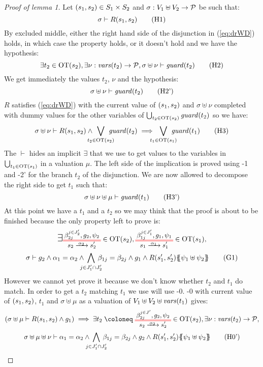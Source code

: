 \documentclass{article}
\begin{document}
\begin{proof}[Proof of lemma 1]
	Let \({\left(s_1, s_2\right)} \in S_1 \times S_2\) and \(\sigma: V_1 \uplus V_2 \to \mathcal{P}\) be such that:
	\[ \sigma \vdash R\mpar{s_1, s_2} \hyp{1} \]
	By excluded middle, either the right hand side of the disjunction in (\ref{eq:drWD}) holds, in which case the property holds, or it doesn't hold and we have the hypothesis:
	\[ \exists t_2 \in \fOT{s_2}, \exists \nu: \fvars{t_2} \to \values, \sigma \uplus \nu \vdash \fguard{t_2} \hyp{2} \]
	We get immediately the values \(t_2\), \(\nu\) and the hypothesis:
	\[ \sigma \uplus \nu \vdash \fguard{t_2} \hyp{2'} \]
	\(R\) satisfies (\ref{eq:drWD}) with the current value of \({\left(s_1, s_2\right)}\) and \(\sigma \uplus \nu\) completed with dummy values for the other variables of \(\bigcup_{t_2 \in \mathrm{OT}{\left(s_2\right)}} \mathit{guard}{\left(t_2\right)}\) so we have:
	\[ \sigma \uplus \nu \vdash R\mpar{s_1, s_2} \wedge \bigvee_\subbox{t_2 \in \fOT{s_2}} \fguard{t_2} \implies \bigvee_\subbox{t_1 \in \fOT{s_1}} \fguard{t_1} \hyp{3} \]
	The \(\vdash\) hides an implicit \(\exists\) that we use to get values to the variables in \(\bigcup_{t_1 \in \mathrm{OT}{\left(s_1\right)}}\) in a valuation \(\mu\).
	The left side of the implication is proved using \hyp{1} and \hyp{2'} for the branch \(t_2\) of the disjunction.
	We are now allowed to decompose the right side to get \(t_1\) such that:
	\[ \sigma \uplus \nu \uplus \mu \vdash \fguard{t_1} \hyp{3'} \]
	At this point we have a \(t_1\) and a \(t_2\) so we may think that the proof is about to be finished because the only property left to prove is:
	\begin{multline}
		\bigsymb{\exists} \OTx{2}{}{2}{2} \in \fOT{s_2}, \OTx{1}{}{1}{1} \in \fOT{s_1}, \\
		\sigma \vdash g_2 \wedge \alpha_1 = \alpha_2 \wedge \bigwedge_\subbox{j \in J'_1 \cap J'_2} \beta_{1j} = \beta_{2j} \wedge g_1 \wedge R\mpar{s'_1, s'_2}\psubst{\psi_1 \uplus \psi_2} \goal{1}
	\end{multline}
	However we cannot yet prove it because we don't know whether \(t_2\) and \(t_1\) do match.
	In order to get a \(t_2\) matching \(t_1\) we use will use \hyp{0}.
	\hyp{0} with current value of \({\left(s_1, s_2\right)}\), \(t_1\) and \(\sigma \uplus \mu\) as a valuation of \(V_1 \uplus V_2 \uplus \mathit{vars}{\left(t_1\right)}\) gives:
	\begin{multline}
		\mpar{\sigma \uplus \mu \vdash R\mpar{s_1, s_2} \wedge g_1} \implies \exists t_2 \defobject \OTx{2}{}{2}{} \in \fOT{s_2}, \exists \nu: \fvars{t_2} \to \values, \\
		\sigma \uplus \mu \uplus \nu \vdash \alpha_1 = \alpha_2 \wedge \bigwedge_\subbox{j \in J'_1 \cap J'_2} \beta_{1j} = \beta_{2j} \wedge g_2 \wedge R\mpar{s'_1, s'_2}\psubst{\psi_1 \uplus \psi_2} \hyp{0'}

\end{multline}
\end{proof}
\end{document}
